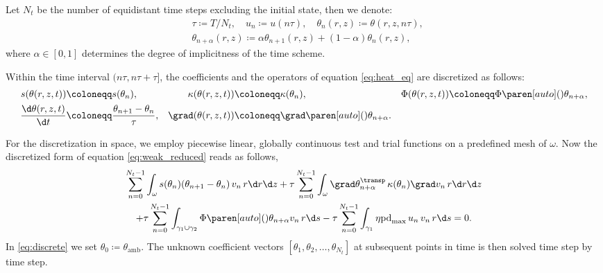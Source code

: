 Let $N_t$ be the number of equidistant time steps excluding the initial state, then we denote:
\begin{equation}
	\begin{aligned}
		&
		\tau 
		\coloneqq 
		T/N_t
		, 
		\quad
		u_n 
		\coloneqq 
		u(n\tau)
		,
		\quad
		\theta_n(r,z) 
		\coloneqq 
		\theta(r,z,n\tau)
		, 
		\\
		&
		\theta_{n+\alpha}(r,z) 
		\coloneqq 
		\alpha\theta_{n+1}(r,z) + (1-\alpha)\theta_n(r,z)
		,
	\end{aligned}
\end{equation}
where $\alpha \in [0,1]$ determines the degree of implicitness of the time scheme.

Within the time interval $(n\tau, n\tau+\tau]$, the coefficients and the operators of equation \eqref{eq:heat_eq} are discretized as follows:
\begin{equation}
	\begin{aligned}
		s(\theta(r,z,t)) 
		&
		\coloneqq 
		s(\theta_n)
		, 
		&
		\kappa(\theta(r,z,t)) 
		&
		\coloneqq 
		\kappa(\theta_n)
		, 
		&
		\Phi(\theta(r,z,t)) 
		&
		\coloneqq 
		\Phi \paren[auto](){\theta_{n+\alpha}}
		, 
		\\
		\frac{\d\theta(r,z,t)}{\d t} 
		&
		\coloneqq 
		\frac{\theta_{n+1}-\theta_n}{\tau}
		, 
		&
		\grad(\theta(r,z,t)) 
		&
		\coloneqq 
		\grad \paren[auto](){\theta_{n+\alpha}}
		.
	\end{aligned}
\end{equation}

For the discretization in space, we employ piecewise linear, globally continuous test and trial functions on a predefined mesh of $\omega$.
Now the discretized form of equation \eqref{eq:weak_reduced} reads as follows,
\begin{multline} \label{eq:discrete}
	\sum_{n=0}^{N_t-1} \int_{\omega}
	s(\theta_n) (\theta_{n+1}-\theta_n) \, v_n \, r \d r \d z
	+ \tau \sum_{n=0}^{N_t-1} \int_{\omega}
	\grad \theta_{n+\alpha}^\transp \, \kappa(\theta_n) \grad v_n \, r \d r \d z 
	\\
	+ \tau \sum_{n=0}^{N_t-1} \int_{\gamma_1 \cup \gamma_2}
	\Phi \paren[auto](){\theta_{n+\alpha}} v_n \, r \d s
	- \tau \sum_{n=0}^{N_t-1} \int_{\gamma_1}
	\eta \text{pd}_{\max} \, u_n \, v_n \, r \d s 
	= 
	0
	.
\end{multline}
In \eqref{eq:discrete} we set $\theta_0 \coloneqq \theta_\text{amb}$.
The unknown coefficient vectors $[\theta_1, \theta_2, \ldots, \theta_{N_t}]$ at subsequent points in time is then solved time step by time step.


